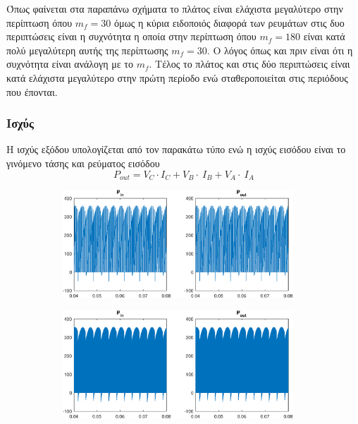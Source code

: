 \noindent
Όπως φαίνεται στα παραπάνω σχήματα το πλάτος είναι ελάχιστα μεγαλύτερο στην περίπτωση όπου $m_f=30$ όμως η κύρια ειδοποιός διαφορά των ρευμάτων στις δυο περιπτώσεις είναι η συχνότητα η οποία στην περίπτωση όπου $m_f=180$ είναι κατά πολύ μεγαλύτερη αυτής της περίπτωσης $m_f=30$. Ο λόγος όπως και πριν είναι ότι η συχνότητα είναι ανάλογη με το $m_f$. Τέλος το πλάτος και στις δύο περιπτώσεις είναι κατά ελάχιστα μεγαλύτερο στην πρώτη περίοδο ενώ σταθεροποιείται στις περιόδους που έπονται.

\subsubsection*{Ισχύς}
Η ισχύς εξόδου υπολογίζεται από τον παρακάτω τύπο ενώ η ισχύς εισόδου είναι το γινόμενο τάσης και ρεύματος εισόδου
\begin{equation*}
	P_{out}=V_C\cdot I_C+V_B\cdot \:I_B+V_A\cdot \:I_A
\end{equation*}
\begin{figure}[h]
	\begin{subfigure}{0.49\textwidth}
		\centering
		\includegraphics[width=0.95\textwidth]{Images/4_P_30.eps}
	\end{subfigure}
	\begin{subfigure}{0.49\textwidth}
		\centering
		\includegraphics[width=0.95\textwidth]{Images/4_P_180.eps}
	\end{subfigure}
\end{figure}

